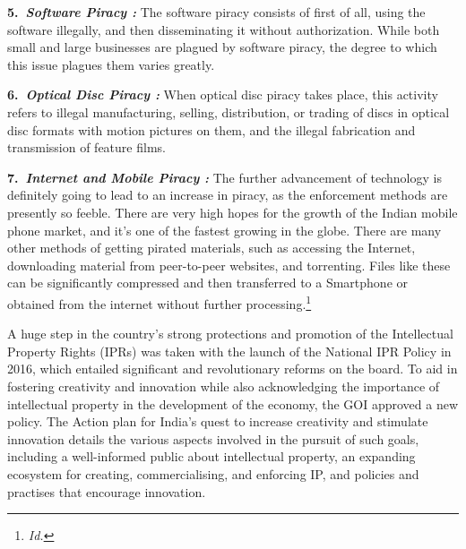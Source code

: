 \begin{multicols}{2}
\vspace{-.15cm}

\noi
{\large \bfseries 5.~\textit{Software Piracy :}} The software piracy consists of first of all, using the software illegally,
and then disseminating it without authorization. While both small and large businesses are
plagued by software piracy, the degree to which this issue plagues them varies greatly.

\vspace{-.15cm}

\noi
{\large \bfseries 6.~\textit{Optical Disc Piracy :}} When optical disc piracy takes place, this activity refers to illegal
manufacturing, selling, distribution, or trading of discs in optical disc formats with motion
pictures on them, and the illegal fabrication and transmission of feature films.

\vspace{-.15cm}

\noi
{\large \bfseries 7.~\textit{Internet and Mobile Piracy :}} The further advancement of technology is definitely going to
lead to an increase in piracy, as the enforcement methods are presently so feeble. There are
very high hopes for the growth of the Indian mobile phone market, and it's one of the fastest
growing in the globe. There are many other methods of getting pirated materials, such as
accessing the Internet, downloading material from peer-to-peer websites, and torrenting. Files
like these can be significantly compressed and then transferred to a Smartphone or obtained
from the internet without further processing.\footnote{\textit{Id.}}


\noi
A huge step in the country’s strong protections and promotion of the Intellectual Property
Rights (IPRs) was taken with the launch of the National IPR Policy in 2016, which entailed
significant and revolutionary reforms on the board. To aid in fostering creativity and
innovation while also acknowledging the importance of intellectual property in the
development of the economy, the GOI approved a new policy. The Action plan for India's
quest to increase creativity and stimulate innovation details the various aspects involved in
the pursuit of such goals, including a well-informed public about intellectual property, an
expanding ecosystem for creating, commercialising, and enforcing IP, and policies and
practises that encourage innovation.

\vspace{-.1cm}


\end{multicols}
